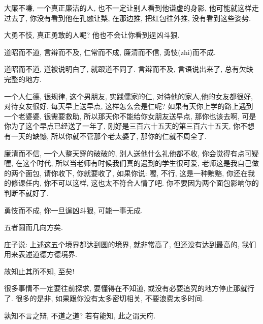 \documentclass[11pt]{article}
\begin{document}
{\color{blue} 大廉不嗛}, 一个真正廉洁的人, 也不一定让别人看到他谦虚的身影, 他可能就这样走过去了, 你没有看到他在孔融让梨, 在那边推, 把红包往外推, 没有看到这些姿势. 

{\color{blue} 大勇不忮}, 真正勇敢的人呢? 他也不会让你看到逞凶斗狠.

\begin{center}
	{\color{magenta} 道昭而不道, 言辩而不及, 仁常而不成, 廉清而不信, 勇忮(zhi)而不成.}
\end{center}

\vspace{-0.5cm}

{\color{blue} 道昭而不道}, 道被说明白了, 就跟道不同了. {\color{blue} 言辩而不及}, 言语说出来了, 总有欠缺完整的地方. 

一个人仁德, 很规律, 这个男朋友, 实践儒家的仁, 对待他的家人,他的女友都很好, 对待女友很好, 每天早上送早点, 这样怎么会是仁呢? 如果有天你上学的路上遇到一个老婆婆, 很需要救助, 所以那天你不能给你女朋友送早点, 那你也该去啊, 可是你为了这个早点已经送了一年了, 刚好是三百六十五天的第三百六十五天, 你不想有一天的缺憾, 所以你就不管那个老太婆了, 那你的仁就不周全了. 

{\color{blue} 廉清而不信}, 一个人整天穿的破破的, 别人送他什么礼他都不收, 你会觉得有点可疑喔, 在这个时代, 所以当老师有时候我们真的遇到的学生很可爱, 老师这是我自己做的两个面包, 请你收下, 你就要收了, 如果你说: 喔, 不行, 这是一种贿赂, 你还在我的修课任内, 你不可以这样, 这也太不符合人情了吧. 你不要因为两个面包影响你的判断不就好了.

{\color{blue} 勇忮而不成}, 你一旦逞凶斗狠, 可能一事无成.

\begin{center}
	{\color{magenta} 五者圆而几向方矣.}
\end{center}

\vspace{-0.5cm}

庄子说: 上述这五个境界都达到圆的境界, 就非常高了, 但还没有达到最高的, 我们用来表述道德方德境界.

\begin{center}
	{\color{magenta} 故知止其所不知, 至矣! }
\end{center}

\vspace{-0.5cm}

很多事情不一定要往前探求, 要懂得在不知道, 或没有必要追究的地方停止那就行了. 很多的是非, 如果跟你没有太多密切相关, 不要浪费太多时间.

\begin{center}
	{\color{magenta} 孰知不言之辩, 不道之道? 若有能知, 此之谓天府.}
\end{center}
\end{document}

